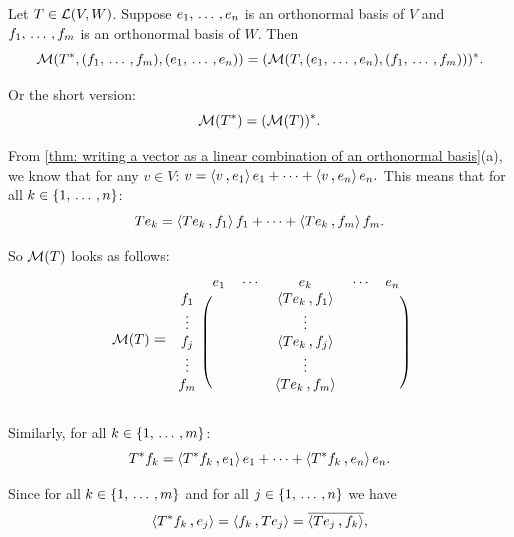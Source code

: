 \begin{thm}
  Let $T \in {\mathcal{L}(V,W)}$. Suppose $e_1, {\, \ldots \,\,}, e_n$ is an orthonormal basis of $V$ and $f_1, {\, \ldots \,\,}, f_m$ is an orthonormal basis of $W$. Then
  \[
    \mathcal{M}(T^*, (f_1, {\, \ldots \,\,}, f_m), (e_1, {\, \ldots \,\,}, e_n)) = ( \mathcal{M}(T, (e_1, {\, \ldots \,\,}, e_n), (f_1, {\, \ldots \,\,}, f_m)))^*.
  \]

  Or the short version:
  \[
     \mathcal{M}(T^*) = (\mathcal{M}(T))^*.
  \]
\end{thm}
\begin{prf}
  From \ref{thm: writing a vector as a linear combination of an orthonormal basis}(a), we know that for any $v\in V$: $v = \ip{v}{e_1}e_1 + \cdots + \ip{v}{e_n}e_n.$ This means that for all $k \in \{1, {\, \ldots \,\,}, n\}$:
  \[
    T e_k = \ip{T e_k}{f_1}f_1 + \cdots + \ip{T e_k}{f_m}f_m.
  \]

  So $\mathcal{M}(T)$ looks as follows:
  \[
    \mmatrix(T)
    \;\mathlarger{=}\;
    \begin{blockarray}{cccccc}
    & e_1 & \cdots &  e_k      & \cdots & e_n \\
    \begin{block}{c(ccccc)}
      f_1    &  &  & \ip{T e_k}{f_1} & & \\
      \vdots &  &  & \vdots          & & \\
      f_j    &  &  & \ip{T e_k}{f_j} & & \\
      \vdots &  &  & \vdots          & & \\
      f_m    &  &  & \ip{T e_k}{f_m} & & \\
    \end{block}
    \end{blockarray}
  \]

  Similarly, for all $k \in \{1, {\, \ldots \,\,}, m\}$:
  \[
    T^* f_k = \ip{T^* f_k}{e_1}e_1 + \cdots + \ip{T^* f_k}{e_n}e_n.
  \]

  Since for all $k \in \{1, {\, \ldots \,\,}, m\}$ and for all $j \in \{1, {\, \ldots \,\,}, n\}$ we have
  \[
    \ip{T^* f_k}{e_j} = \ip{f_k}{T e_j} = \overline{\ip{T e_j}{f_k}},
  \]


\end{prf}

